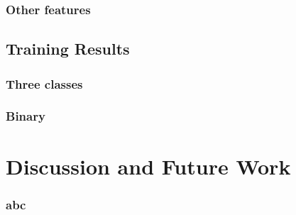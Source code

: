 \documentclass[11pt,aspectratio=169]{beamer}
\begin{document}
    \begin{frame}
        \frametitle{Other features}

    \end{frame}

    \subsection{Training Results}

    \begin{frame}
        \frametitle{Three classes}

    \end{frame}


    \begin{frame}
        \frametitle{Binary}

    \end{frame}


    \section{Discussion and Future Work}
    \frame{\sectionpage}
    \begin{frame}
        \frametitle{abc}

    \end{frame}
\end{document}
